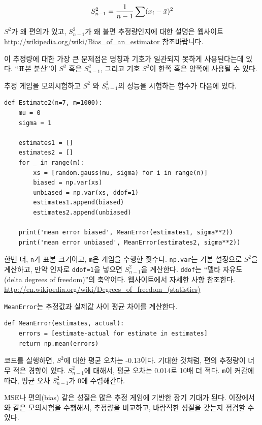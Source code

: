 %
\[ S_{n-1}^2 = \frac{1}{n-1} \sum (x_i - \bar{x})^2 \] 
%

$S^2$가 왜 편의가 있고, $S_{n-1}^2$가 왜 불편 추정량인지에 대한 설명은 웹사이트 \url{http://wikipedia.org/wiki/Bias_of_an_estimator} 참조바랍니다.

이 추정량에 대한 가장 큰 문제점은 명칭과 기호가 일관되지 못하게 사용된다는데 있다. ``표본 분산''이 $S^2$ 혹은 $S_{n-1}^2$, 
그리고 기호 $S^2$이 한쪽 혹은 양쪽에 사용될 수 있다.

추정 게임을 모의시험하고 $S^2$ 와 $S_{n-1}^2$의 성능을 시험하는 함수가 다음에 있다.

\begin{verbatim}
def Estimate2(n=7, m=1000):
    mu = 0
    sigma = 1

    estimates1 = []
    estimates2 = []
    for _ in range(m):
        xs = [random.gauss(mu, sigma) for i in range(n)]
        biased = np.var(xs)
        unbiased = np.var(xs, ddof=1)
        estimates1.append(biased)
        estimates2.append(unbiased)

    print('mean error biased', MeanError(estimates1, sigma**2))
    print('mean error unbiased', MeanError(estimates2, sigma**2))
\end{verbatim}

한번 더, {\tt n}가 표본 크기이고, {\tt m}은 게임을 수행한 횟수다.
{\tt np.var}는 기본 설정으로 $S^2$을 계산하고, 만약 인자로 {\tt ddof=1}을 넣으면 $S_{n-1}^2$을 계산한다. {\tt ddof}는 ``델타 자유도 (delta degrees of freedom)''의 축약어다. 웹사이트에서 자세한 사항 참조한다. \url{http://en.wikipedia.org/wiki/Degrees_of_freedom_(statistics)}

{\tt MeanError}는 추정값과 실제값 사이 평균 차이를 계산한다.

\begin{verbatim}
def MeanError(estimates, actual):
    errors = [estimate-actual for estimate in estimates]
    return np.mean(errors)
\end{verbatim}

코드를 실행하면, $S^2$에 대한 평균 오차는 -0.13이다.
기대한 것처럼, 편의 추정량이 너무 적은 경향이 있다. 
$S_{n-1}^2$에 대해서, 평균 오차는 0.014로 10배 더 적다.
{\tt m}이 커감에 따라, 평균 오차 $S_{n-1}^2$가 0에 수렴해간다.


MSE나 편의(bias) 같은 성질은 많은 추정 게임에 기반한 장기 기대가 된다.
이장에서와 같은 모의시험을 수행해서, 추정량을 비교하고, 바람직한 성질을 갖는지 점검할 수 있다.

